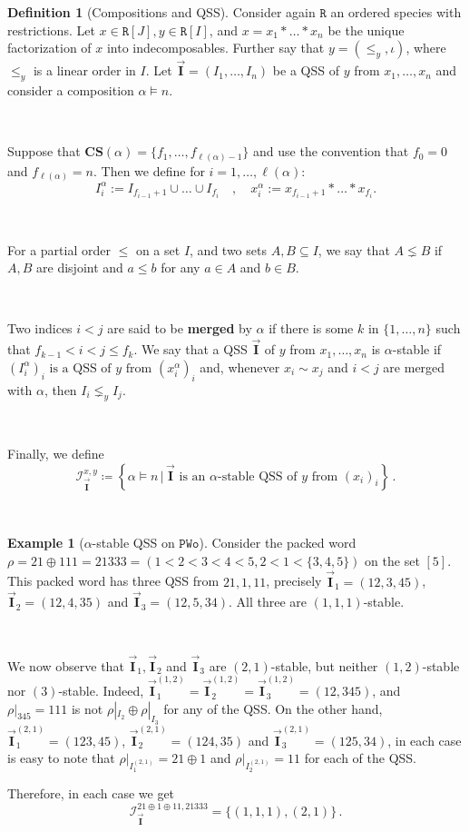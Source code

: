 \documentclass[12pt, reqno]{amsart}
\theoremstyle{definition}
\newtheorem{defin}[thm]{Definition}
\newtheorem{smpl}[thm]{Example}
\newcommand{\III}{\vec{\mathbf{I}}}
\begin{document}
\begin{defin}[Compositions and QSS]
Consider again $\mathtt{R}$ an ordered species with restrictions.
Let $x \in \mathtt{R}[J], y \in  \mathtt{R}[I]$, and $x = x_1\ast \dots \ast x_n$ be the unique factorization of $x$ into indecomposables.
Further say that $y = (\leq_y, \iota)$, where $\leq_y$ is a linear order in $I$.
Let $\III = (I_1, \dots , I_n)$ be a QSS of $y$ from $x_1, \dots, x_n$ and consider a composition $\alpha \models n$.

\

Suppose that $ \mathbf{CS} (\alpha) = \{f_1, \dots, f_{\ell(\alpha) - 1} \}$ and use the convention that $f_0 = 0$ and $f_{\ell(\alpha)} = n$. 
Then we define for $i = 1, \dots, \ell(\alpha)$:
\[I^{\alpha}_i := I_{f_{i-1} + 1} \cup \dots \cup I_{f_i} \quad , \quad x^{\alpha}_i := x_{f_{i-1} + 1} \ast \dots \ast x_{f_i}.\]

\

For a partial order $\leq$ on a set $I$, and two sets $A, B \subseteq I$, we say that $A \lneq B$ if $A, B$ are disjoint and $a \leq b$ for any $a \in A$ and $b \in B$.

\

Two indices $i< j$ are said to be \textbf{merged} by $\alpha$ if there is some $k$ in $\{1, \dots, n\}$ such that $ f_{k-1} < i < j \leq f_k$.
We say that a QSS $\III$ of $y$ from $x_1, \dots , x_n$ is $\alpha $-stable if $(I^{\alpha}_i)_i \text{ is a QSS of $y$ from } (x^{\alpha}_i)_i$ and, whenever $x_i \sim x_j$ and $i < j$ are merged with $\alpha $, then $I_i \lneq_y I_j$.

\

Finally, we define 
\begin{equation}
   \mathcal I^{x, y}_{\III} \coloneqq \left\{ \alpha \models n \,\Big| \,\III \text{ is an $\alpha$-stable QSS of $y$ from } (x_i)_i \right\} \, . 
\end{equation}
\end{defin}

\

\begin{smpl}[$\alpha$-stable QSS on $\mathtt{PWo}$]
Consider the packed word $\rho = 21 \oplus 111 = 21333 = (1 < 2 < 3 < 4 < 5, 2 < 1 < \{3, 4, 5\})$ on the set $[5]$.
This packed word has three QSS from $21, 1, 11$, precisely $\III_1 =(12, 3, 45)$, $\III_2 =(12, 4, 35)$ and $\III_3 =(12, 5, 34)$.
All three are $(1, 1, 1)$-stable.

\

We now observe that $\III_1, \III_2$ and $\III_3$ are $(2, 1)$-stable, but neither $(1, 2)$-stable nor $(3)$-stable.
Indeed, $\III_1^{(1, 2)} = \III_2^{(1, 2)} = \III_3^{(1, 2)} = (12, 345)$, and $\rho|_{345} = 111$ is not $\rho|_{I_2} \oplus \rho|_{I_3}$ for any of the QSS.
On the other hand, $\III_1^{(2, 1)} = (123, 45)$, $\III_2^{(2, 1)} = (124, 35)$ and $\III_3^{(2, 1)} = (125, 34)$, in each case is easy to note that $\rho|_{I_1^{(2, 1)}} = 21\oplus 1$ and $\rho|_{I_2^{(2, 1)}} = 11$ for each of the QSS.

Therefore, in each case we get
$$\mathcal I_{\III}^{21\oplus 1\oplus 11, 21333} = \{(1, 1, 1), (2, 1)\}\, . $$
\end{smpl}
\end{document}
